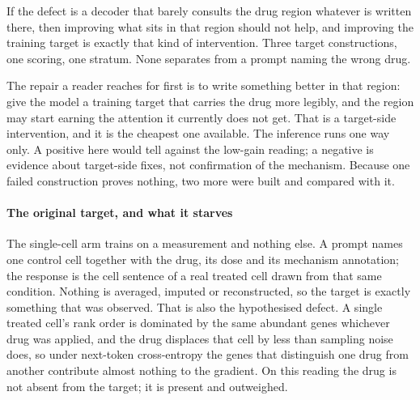 \clearpage
{}

\begin{question}[4]
If the defect is a decoder that barely consults the drug region whatever is
written there, then improving what sits in that region should not help, and
improving the training target is exactly that kind of intervention. Three
target constructions, one scoring, one stratum. None separates from a prompt
naming the wrong drug.
\end{question}

\noindent
The repair a reader reaches for first is to write something better in that region: give the
model a training target that carries the drug more legibly, and the region may
start earning the attention it currently does not get. That is a target-side
intervention, and it is the cheapest one available. The inference runs one way
only. A positive here would tell against the low-gain reading; a negative is
evidence about target-side fixes, not confirmation of the mechanism. Because one
failed construction proves nothing, two more were built and compared with it.

\paragraph{The original target, and what it starves} The single-cell arm trains
on a measurement and nothing else. A prompt names one control cell together with
the drug, its dose and its mechanism annotation; the response is the cell
sentence of a real treated cell drawn from that same condition. Nothing is
averaged, imputed or reconstructed, so the target is exactly something that was
observed. That is also the hypothesised defect. A single treated cell's rank
order is dominated by the same abundant genes whichever drug was applied, and the
drug displaces that cell by less than sampling noise does, so under next-token
cross-entropy the genes that distinguish one drug from another contribute almost
nothing to the gradient. On this reading the drug is not absent from the target;
it is present and outweighed.

